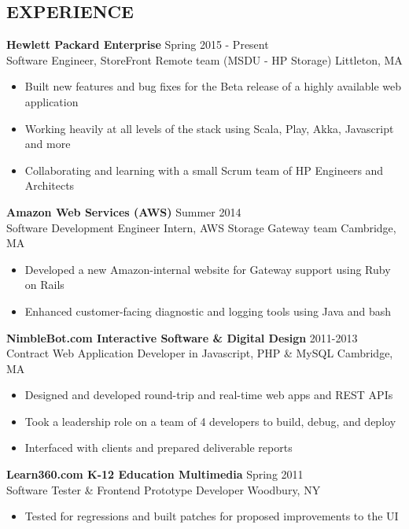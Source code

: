 \documentclass[line,margin]{res}
\begin{document}
\begin{resume}
\section{EXPERIENCE}
    {\large \textbf{Hewlett Packard Enterprise}}
    \hfill Spring 2015 - Present \\
    Software Engineer, StoreFront Remote team (MSDU - HP Storage)
    \hfill Littleton, MA
    \begin{itemize}  \itemsep -2pt %
        \item Built new features and bug fixes for the Beta release of a highly available web application
        \item Working heavily at all levels of the stack using Scala, Play, Akka, Javascript and more
        \item Collaborating and learning with a small Scrum team of HP Engineers and Architects
    \end{itemize}

    {\large \textbf{Amazon Web Services (AWS)}}
    \hfill Summer 2014 \\
    Software Development Engineer Intern, AWS Storage Gateway team
    \hfill Cambridge, MA
    \begin{itemize}  \itemsep -2pt
        \item Developed a new Amazon-internal website for Gateway support using Ruby on Rails
        \item Enhanced customer-facing diagnostic and logging tools using Java and bash
    \end{itemize}
    
    {\large \textbf{NimbleBot.com Interactive Software \& Digital Design}}
    \hfill 2011-2013 \\
    Contract Web Application Developer in Javascript, PHP \& MySQL
    \hfill Cambridge, MA
    \begin{itemize}  \itemsep -2pt %
        \item Designed and developed round-trip and real-time web apps and REST APIs
        \item Took a leadership role on a team of 4 developers to build, debug, and deploy
        \item Interfaced with clients and prepared deliverable reports
    \end{itemize}

    {\large \textbf{Learn360.com K-12 Education Multimedia}}
    \hfill Spring 2011 \\
    Software Tester \& Frontend Prototype Developer
    \hfill Woodbury, NY
    \begin{itemize}  \itemsep -2pt %
        \item Tested for regressions and built patches for proposed improvements to the UI
    \end{itemize}


\end{resume}
\end{document}
